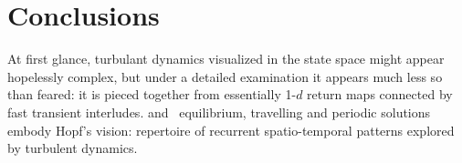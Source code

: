 %


\section{Conclusions}
\label{sec:rpo-concl}


At first glance, turbulant dynamics visualized in the state space might appear
hopelessly complex, but under a detailed examination it appears 
much less so than feared: it is
pieced together from essentially {1-$d$ return maps}
connected by fast transient interludes.
{\KS} and \PCf\  equilibrium, travelling and 
periodic solutions embody Hopf's vision:
repertoire of recurrent spatio-temporal
patterns explored by turbulent dynamics.
